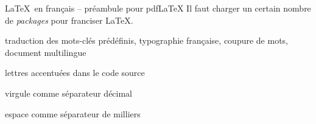 \begin{frame}[fragile]{\LaTeX\ en français -- préambule pour pdf\LaTeX}
	Il faut charger un certain nombre de \emph{packages} pour franciser \LaTeX.


	\pause
	\begin{description}
		\item[babel] traduction des mots-clés prédéfinis, typographie française, coupure de mots,
		document multilingue
		
		\pause
		\item[inputenc et fontenc] lettres accentuées dans le code source
		
		\pause
		\item[icomma] virgule comme séparateur décimal
		
		\pause
		\item[numprint] espace comme séparateur de milliers
	\end{description}
\end{frame}